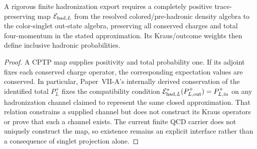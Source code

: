 \documentclass[12pt,a4paper]{article}
\begin{document}
\begin{proposition}
\label{p11:prop:fragmentation-as-singlet-outcome}

A rigorous finite hadronization export requires a completely positive trace-preserving map \(\mathcal E_{{\rm had},L}\) from the resolved colored/pre-hadronic density algebra to the color-singlet out-state algebra, preserving all conserved charges and total four-momentum in the stated approximation.  Its Kraus/outcome weights then define inclusive hadronic probabilities.
\label{p11:eq:native-hadronization-map}
\end{proposition}
\begin{proof}

A CPTP map supplies positivity and total probability one.  If its adjoint fixes each conserved charge operator, the corresponding expectation values are conserved.  In particular, Paper~VII-A's internally derived conservation of the identified total $P_L^+$ fixes the compatibility condition $\mathcal E_{{\rm had},L}^*(P_{L,{\rm out}}^+)=P_{L,{\rm in}}^+$ on any hadronization channel claimed to represent the same closed approximation.  That relation constrains a supplied channel but does not construct its Kraus operators or prove that such a channel exists.  The current finite QCD carrier does not uniquely construct the map, so existence remains an explicit interface rather than a consequence of singlet projection alone.
\end{proof}
\end{document}
